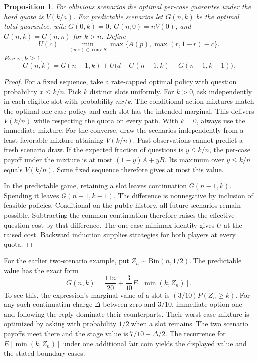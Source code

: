\documentclass[11pt]{article}
\newtheorem{proposition}{Proposition}
\begin{document}
\begin{proposition}
For oblivious scenarios the optimal per-case guarantee under the
hard quota is $V(k/n)$. For predictable scenarios let $G(n,k)$
be the optimal total guarantee, with $G(0,k)=0$,
$G(n,0)=nV(0)$, and $G(n,k)=G(n,n)$ for $k>n$. Define
\[
 U(c)=\min_{(p,r)\in\operatorname{conv}S}
              \max\{A(p),\max(r,1-r)-c\}.
\]
For $n,k\ge1$,
\[
 G(n,k)=G(n-1,k)+U\bigl(d+G(n-1,k)-G(n-1,k-1)\bigr).
\]
\end{proposition}
\begin{proof}
For a fixed sequence, take a rate-capped optimal policy with question
probability $x\le k/n$. Pick $k$ distinct slots uniformly. For $k>0$,
ask independently in each eligible slot with probability $nx/k$.
The conditional action mixtures match the optimal one-case policy
and each slot has the intended marginal. This delivers $V(k/n)$
while respecting the quota on every path. With $k=0$, always use
the immediate mixture. For the converse, draw the scenarios
independently from a least favorable mixture attaining $V(k/n)$.
Past observations cannot predict a fresh scenario draw.
If the expected fraction of questions is $y\le k/n$, the per-case
payoff under the mixture is at most $(1-y)A+yB$. Its maximum over
$y\le k/n$ equals $V(k/n)$. Some fixed sequence therefore gives
at most this value.

In the predictable game, retaining a slot leaves continuation
$G(n-1,k)$. Spending it leaves $G(n-1,k-1)$. The difference is
nonnegative by inclusion of feasible policies. Conditional on the
public history, all future scenarios remain possible. Subtracting
the common continuation therefore raises the effective question
cost by that difference. The one-case minimax identity gives $U$
at the raised cost. Backward induction supplies strategies for
both players at every quota.
\end{proof}

For the earlier two-scenario example, put $Z_n\sim\mathrm{Bin}(n,1/2)$.
The predictable value has the exact form
\[
 G(n,k)=\frac{11n}{20}+\frac3{10} E[\min(k,Z_n)].
\]
To see this, the expression's marginal value of a slot is
$(3/10)P(Z_n\ge k)$. For any such continuation charge $\Delta$
between zero and $3/10$, immediate option one and following the
reply dominate their counterparts. Their worst-case mixture is
optimized by asking with probability $1/2$ when a slot remains.
The two scenario payoffs meet there and the stage value is
$7/10-\Delta/2$. The recurrence for $E[\min(k,Z_n)]$ under one
additional fair coin yields the displayed value and the stated
boundary cases.
\end{document}
